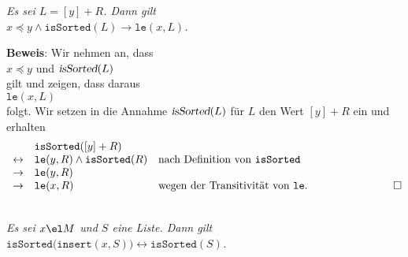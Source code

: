 \begin{Corollary}
{\em
  Es sei $L = [y] + R$. Dann gilt \\[0.1cm]
  \hspace*{1.3cm} 
  $x \preceq y \wedge \mathtt{isSorted}(L) \rightarrow \mathtt{le}(x,L)$.
}
\end{Corollary}

\noindent
\textbf{Beweis}: Wir nehmen an, dass \\[0.1cm]
\hspace*{1.3cm} $x \preceq y$ \quad und \quad $\textsl{isSorted}(L)$ \\[0.1cm]
gilt und zeigen, dass daraus \\[0.1cm]
\hspace*{1.3cm} $\mathtt{le}(x,L)$ \\[0.1cm]
folgt.  Wir setzen in die Annahme $\textsl{isSorted}(L)$ f\"ur $L$ den Wert $[y] + R$ ein und erhalten 
$$
\begin{array}[b]{lll}
                & \mathtt{isSorted}([y] + R) \\
\leftrightarrow & \mathtt{le}(y, R) \wedge \mathtt{isSorted}(R) & \mbox{nach Definition von \texttt{isSorted}} \\
\rightarrow     & \mathtt{le}(y, R)  \\
\rightarrow     & \mathtt{le}(x, R) & \mbox{wegen der Transitivit\"at von \texttt{le}}. 
\end{array}\hspace*{2.6cm} \Box
$$

\begin{Lemma} \hspace*{\fill}\\
{\em
  Es sei $x\el M$ und $S$ eine Liste. Dann gilt \\[0.1cm]
  \hspace*{1.3cm} $ \mathtt{isSorted}\bigl(\mathtt{insert}(x,S) \bigr) \leftrightarrow \mathtt{isSorted}(S)$. 
}  
\end{Lemma}
  
